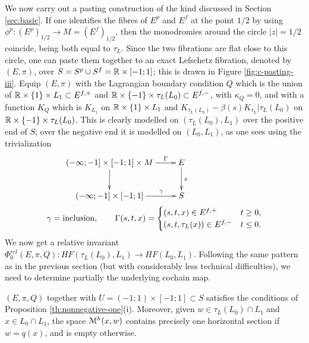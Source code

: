 \documentclass[10pt,letterpaper]{article}
\begin{document}
%
We now carry out a pasting construction of the kind discussed in Section
\ref{sec:basic}. If one identifies the fibres of $E^p$ and $E^f$ at the point
$1/2$ by using $\phi^p: (E^p)_{1/2} \rightarrow M = (E^f)_{1/2}$, then the
monodromies around the circle $|z| = 1/2$ coincide, being both equal to
$\tau_L$. Since the two fibrations are flat close to this circle, one can paste
them together to an exact Lefschetz fibration, denoted by $(E,\pi)$, over $S =
S^p \cup S^f = \mathbb{R} \times [-1;1]$; this is drawn in Figure
\ref{fig:c-pasting-iii}. Equip $(E,\pi)$ with the Lagrangian boundary condition
$Q$ which is the union of $\mathbb{R} \times \{1\} \times L_1 \subset E^{f,+}$ and $\mathbb{R}
\times \{-1\} \times \tau_L(L_0) \subset E^{f,-}$, with $\kappa_Q = 0$, and
with a function $K_Q$ which is $K_{L_1}$ on $\mathbb{R} \times \{1\} \times L_1$ and
$K_{\tau_L(L_0)} - \beta(s)K_{\tau_L}|\tau_L(L_0)$ on $\mathbb{R} \times \{-1\} \times
\tau_L(L_0)$. This is clearly modelled on $(\tau_L(L_0),L_1)$ over the positive
end of $S$; over the negative end it is modelled on $(L_0,L_1)$, as one sees
using the trivialization
\begin{align*}
 & \qquad \xymatrix{
 {(-\infty;-1] \times [-1;1] \times M} \ar[r]^-{\Gamma} \ar[d] & {E} \ar[d]^\pi \\
 {(-\infty;-1] \times [-1;1]} \ar[r]^-{\gamma} & {S}
 } \\
 &
 \gamma = \text{inclusion}, \qquad
 \Gamma(s,t,x) = \begin{cases}
 (s,t,x) \in E^{f,+} & t \geq 0, \\
 (s,t,\tau_L(x)) \in E^{f,-} & t \leq 0.
 \end{cases}
\end{align*}
We now get a relative invariant $\Phi^{rel}_0(E,\pi,Q): HF(\tau_L(L_0),L_1)
\rightarrow HF(L_0,L_1)$. Following the same pattern as in the previous section
(but with considerably less technical difficulties), we need to determine
partially the underlying cochain map.

\begin{lemma} \label{th:c}
$(E,\pi,Q)$ together with $U = (-1;1) \times [-1;1] \subset S$ satisfies the
conditions of Proposition \ref{th:nonnegative-one}(i). Moreover, given $w \in
\tau_L(L_0) \cap L_1$ and $x \in L_0 \cap L_1$, the space $\mathcal{M}^h(x,w)$ contains
precisely one horizontal section if $w = q(x)$, and is empty otherwise.
\end{lemma}
\end{document}
